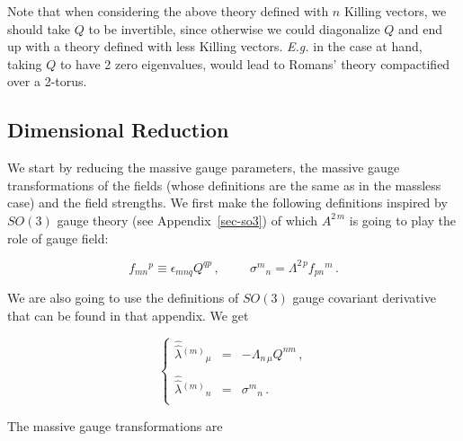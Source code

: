 \documentclass[12pt,a4paper]{article}
\begin{document}
Note that when considering the above theory defined with $n$ Killing
vectors, we should take $Q$ to be invertible, since otherwise we could
diagonalize $Q$ and end up with a theory defined with less Killing
vectors. {\em E.g.} in the case at hand, taking $Q$ to have 2 zero
eigenvalues, would lead to Romans' theory compactified over a 2-torus.

\subsection{Dimensional Reduction}

We start by reducing the massive gauge parameters, the massive gauge
transformations of the fields (whose definitions are the same as in
the massless case) and the field strengths.  We first make the
following definitions inspired by $SO(3)$ gauge theory (see
Appendix~\ref{sec-so3}) of which $A^{2\, m}$ is going to play the role
of gauge field:


\begin{equation}
f_{mn}{}^{p}\equiv\epsilon_{mnq}Q^{qp}\, ,
\hspace{1cm}
\sigma^{m}{}_{n} = \Lambda^{2\, p}f_{pn}{}^{m}\, .
\end{equation}

\noindent We are also going to use the definitions of $SO(3)$
gauge covariant derivative that can be found in that appendix.  We get

\begin{equation}
\left\{
\begin{array}{rcl}
\hat{\hat{\lambda}}{}^{(m)}{}_{\mu} & = & -\Lambda_{n\, \mu}Q^{nm}\, ,\\
& & \\
\hat{\hat{\lambda}}{}^{(m)}{}_{n} & = & \sigma^{m}{}_{n}\, .\\
\end{array}
\right.
\end{equation}

The massive gauge transformations are
\end{document}
